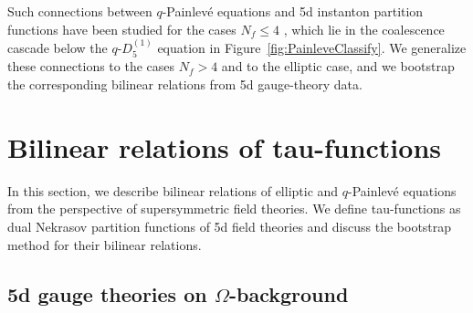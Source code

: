 \documentclass[11pt, a4paper]{article}
\theoremstyle{definition}
\begin{document}
Such connections between $ q $-Painlev\'e equations and 5d instanton partition functions have been studied for the cases $ N_f \leq 4 $ \cite{Bershtein:2016aef, Jimbo:2017ael, Matsuhira:2018qtx,Gavrylenko:2025nuo}, which lie in the coalescence cascade below the $ q\text{-}D_5^{(1)} $ equation in Figure~\ref{fig:PainleveClassify}. We generalize these connections to the cases $ N_f>4 $ and to the elliptic case, and we bootstrap the corresponding bilinear relations from 5d gauge-theory data.




\section{Bilinear relations of tau-functions}\label{sec:5dbootstrap}

In this section, we describe bilinear relations of elliptic and $ q $-Painlev\'e equations from the perspective of supersymmetric field theories. We define tau-functions as dual Nekrasov partition functions of 5d field theories and discuss the bootstrap method for their bilinear relations.

\subsection{5d gauge theories on \texorpdfstring{$ \Omega $}{Ω}-background}\label{sec:5d}
\end{document}
